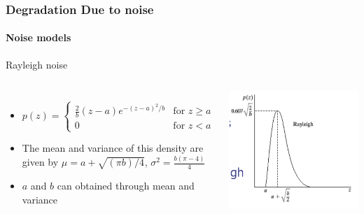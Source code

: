 \documentclass{beamer}
\begin{document}
\begin{frame}	
\frametitle{Degradation Due to noise}
\framesubtitle{Noise models}
\begin{block}{Rayleigh noise}
\begin{columns}
\begin{itemize}
	\item [] 
		\[
 	p(z) = 
  	\begin{cases} 
   	\frac{2}{b}(z-a)e^{-(z-a)^2/b} & \text{for } z \geq a \\
   	0 & \text{for } z < a
  	\end{cases}
	\]
	\item The mean and variance of this density are given by 
	$\mu = a +\sqrt{(\pi b)/4}$, $\sigma^2 = \frac{b(\pi-4)}{4}$
	\item $a$ and $b$ can obtained through mean and variance  
\end{itemize}
\includegraphics[scale=0.15]{images/L5_DR_RN1.png}
\end{columns}		
\end{block}
\end{frame}
\end{document}
